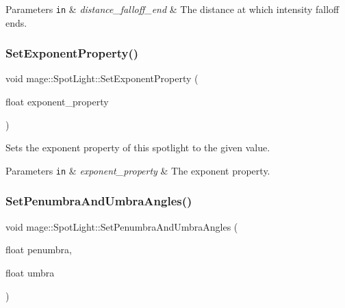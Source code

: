 \begin{DoxyParams}[1]{Parameters}
\mbox{\tt in}  & {\em distance\+\_\+falloff\+\_\+end} & The distance at which intensity falloff ends. \\
\hline
\end{DoxyParams}
\hypertarget{classmage_1_1_spot_light_aebe212a24ba81f744c74e9b6747031bd}{}\label{classmage_1_1_spot_light_aebe212a24ba81f744c74e9b6747031bd} 
\subsubsection{\texorpdfstring{Set\+Exponent\+Property()}{SetExponentProperty()}}
{\footnotesize\ttfamily void mage\+::\+Spot\+Light\+::\+Set\+Exponent\+Property (\begin{DoxyParamCaption}\item[{float}]{exponent\+\_\+property }\end{DoxyParamCaption})\hspace{0.3cm}{\ttfamily [noexcept]}}

Sets the exponent property of this spotlight to the given value.


\begin{DoxyParams}[1]{Parameters}
\mbox{\tt in}  & {\em exponent\+\_\+property} & The exponent property. \\
\hline
\end{DoxyParams}
\hypertarget{classmage_1_1_spot_light_ab4fee7e6685331be0e9b054ad457d808}{}\label{classmage_1_1_spot_light_ab4fee7e6685331be0e9b054ad457d808} 
\subsubsection{\texorpdfstring{Set\+Penumbra\+And\+Umbra\+Angles()}{SetPenumbraAndUmbraAngles()}}
{\footnotesize\ttfamily void mage\+::\+Spot\+Light\+::\+Set\+Penumbra\+And\+Umbra\+Angles (\begin{DoxyParamCaption}\item[{float}]{penumbra,  }\item[{float}]{umbra }\end{DoxyParamCaption})\hspace{0.3cm}{\ttfamily [noexcept]}}

